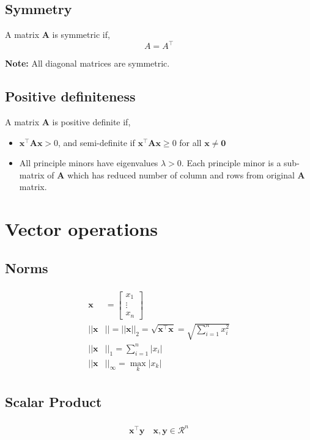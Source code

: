 \subsection{Symmetry}
A matrix $\mathbf{A}$ is symmetric if,
\begin{equation}
    A = A^\top 
\end{equation}

\textbf{Note:} All diagonal matrices are symmetric.

\subsection{Positive definiteness}
A matrix $\mathbf{A}$ is positive definite if,
\begin{itemize}
    \item $\mathbf{x^\top A x} > 0$, and semi-definite if $\mathbf{x^\top A x} \geq 0$ for all $\mathbf{x} \neq \mathbf{0}$
    \item All principle minors have eigenvalues $\lambda > 0$. Each principle minor is a sub-matrix of $\textbf{A}$ which has reduced number of column and rows from original $\textbf{A}$ matrix.
\end{itemize}

\section{Vector operations}

\subsection{Norms}
\begin{align}
    \begin{split}
        \mathbf{x}& = \begin{bmatrix}
            x_1 \\ \vdots \\ x_n
        \end{bmatrix}
        \\
        ||\mathbf{x}&|| = ||\mathbf{x}||_2 = \sqrt{\mathbf{x}^\top \mathbf{x}} = \sqrt{\sum_{i=1}^n x_i^2}
        \\
        ||\mathbf{x}&||_1 = \sum_{i=1}^n |x_i|
        \\
        ||\mathbf{x}&||_\infty = \max_k |x_k|
    \end{split}
\end{align}

\subsection{Scalar Product}
\begin{align}
    \begin{split}
        \mathbf{x^\top y} \quad \mathbf{x, y} \in \mathcal{R}^n
    \end{split}
\end{align}

